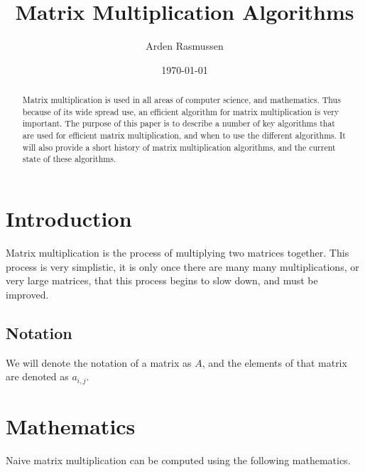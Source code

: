 \documentclass[10pt]{amsart}
\title{Matrix Multiplication Algorithms}
\author{Arden Rasmussen}
\date{\today}
\begin{document}
\maketitle

\begin{abstract}
   Matrix multiplication is used in all areas of computer science, and
   mathematics. Thus because of its wide spread use, an efficient algorithm for
   matrix multiplication is very important. The purpose of this paper is to
   describe a number of key algorithms that are used for efficient matrix
   multiplication, and when to use the different algorithms. It will also
   provide a short history of matrix multiplication algorithms, and the current
   state of these algorithms.
\end{abstract}

\begin{multicols}{2}

\section{Introduction}%
\label{sec:introduction}

Matrix multiplication is the process of multiplying two matrices together. This
process is very simplistic, it is only once there are many many
multiplications, or very large matrices, that this process begins to slow
down, and must be improved.

\subsection{Notation}%
\label{sub:notation}

We will denote the notation of a matrix as $A$, and the elements of that matrix
are denoted as $a_{i,j}$.

\section{Mathematics}%
\label{sec:mathematics}

Naive matrix multiplication can be computed using the following mathematics.

\end{multicols}
\end{document}
